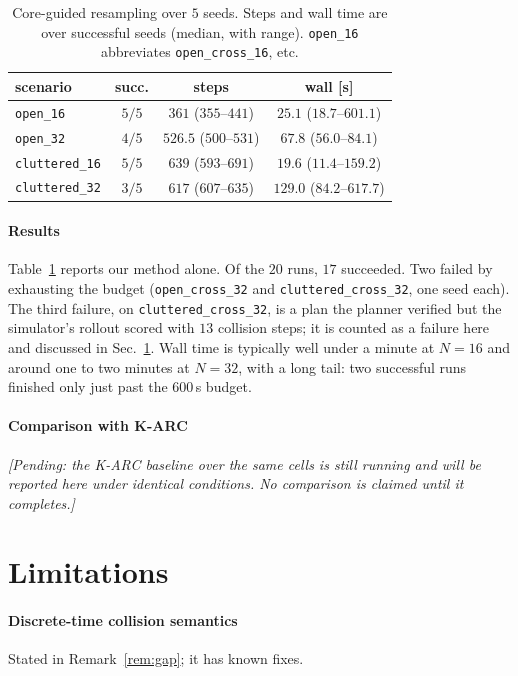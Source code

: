 \documentclass[conference]{IEEEtran}
\theoremstyle{plain}
\theoremstyle{definition}
\begin{document}
\begin{table}[t]
\caption{Core-guided resampling over $5$ seeds. Steps and wall time are over successful seeds
(median, with range). \texttt{open\_16} abbreviates \texttt{open\_cross\_16}, etc.}
\label{tab:results}
\centering
\small
\setlength{\tabcolsep}{2.5pt}
\begin{tabular}{lccc}
\toprule
scenario & succ. & steps & wall [s] \\
\midrule
\texttt{open\_16}      & $5/5$ & $361$ ($355$--$441$) & $25.1$ ($18.7$--$601.1$) \\
\texttt{open\_32}      & $4/5$ & $526.5$ ($500$--$531$) & $67.8$ ($56.0$--$84.1$) \\
\texttt{cluttered\_16} & $5/5$ & $639$ ($593$--$691$) & $19.6$ ($11.4$--$159.2$) \\
\texttt{cluttered\_32} & $3/5$ & $617$ ($607$--$635$) & $129.0$ ($84.2$--$617.7$) \\
\bottomrule
\end{tabular}
\end{table}

\paragraph*{Results}
Table~\ref{tab:results} reports our method alone. Of the $20$ runs, $17$ succeeded. Two failed
by exhausting the budget (\texttt{open\_cross\_32} and \texttt{cluttered\_cross\_32}, one seed
each). The third failure, on \texttt{cluttered\_cross\_32}, is a plan the planner verified but
the simulator's rollout scored with $13$ collision steps; it is counted as a failure here and
discussed in Sec.~\ref{sec:limits}. Wall time is typically well under a minute at $N = 16$ and
around one to two minutes at $N = 32$, with a long tail: two successful runs finished only
just past the $600$\,s budget.

\paragraph*{Comparison with K-ARC}
\emph{[Pending: the K-ARC baseline over the same cells is still running and will be reported
here under identical conditions. No comparison is claimed until it completes.]}

\section{Limitations}
\label{sec:limits}

\paragraph*{Discrete-time collision semantics}
Stated in Remark~\ref{rem:gap}; it has known fixes.
\end{document}
